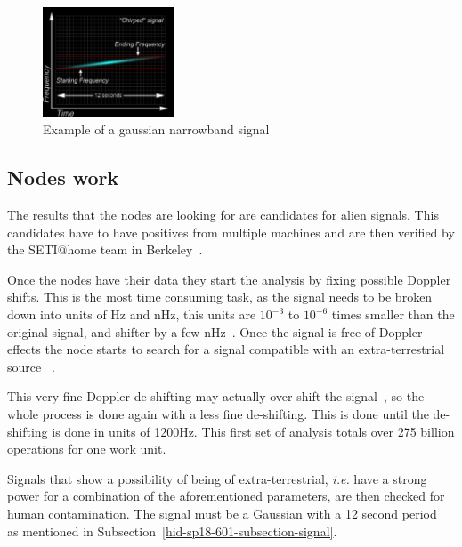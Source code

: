 \begin{figure}[!htb]
        \centering
        \includegraphics[width=0.35\textwidth]{figures/narrow_chirped.pdf}
        \caption{Example of a gaussian narrowband
        signal~\cite{hid-sp18-601-www-sathome-howworks}}\label{dopplerfigure}
\end{figure}

\subsection{Nodes work}\label{hid-sp18-601-subsection-nodes-work}
The results that the nodes are looking for are candidates for alien signals.
This candidates have to have positives from multiple machines and are then 
verified by the SETI$@$home team in 
Berkeley~\cite{hid-sp18-601-www-sathome-howworks}.

Once the nodes have their data they start the analysis by fixing possible 
Doppler shifts. This is the most time consuming task, as the signal needs to be 
broken down into units of Hz and nHz, this units are $10^{-3}$ to $10^{-6}$ 
times smaller than the original signal, and shifter by a few 
nHz~\cite{hid-sp18-601-www-sathome-howworks}. Once the signal is free of Doppler
 effects the node starts to search for a signal compatible with an 
extra-terrestrial source
~\cite{hid-sp18-601-www-sathome-howworks,hid-sp18-601-paper-cocconi1959searching}.

This very fine Doppler de-shifting may actually over shift the 
signal~\cite{hid-sp18-601-www-sathome-howworks}, so the whole
process is done again with a less fine de-shifting. This is done until the 
de-shifting
is done in units of 1200Hz. This first set of analysis totals over 275 billion 
operations for one work unit.

Signals that show a possibility of being of extra-terrestrial, \textit{i.e.} 
have a strong power for a combination of the aforementioned parameters, are then 
 checked for human contamination. The signal must be 
a Gaussian with a 12 second period~\cite{hid-sp18-601-paper-anderson2002seti} as
mentioned in Subsection~\ref{hid-sp18-601-subsection-signal}.

